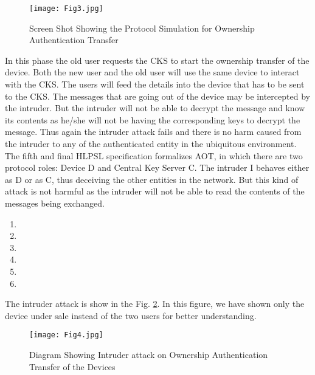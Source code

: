 \documentclass[letterpaper]{article}
\begin{document}
\begin{figure}[bpht!]
\centering
\texttt{[image: Fig3.jpg]}
\caption{Screen Shot Showing the Protocol Simulation for Ownership Authentication Transfer }
\label{fig:3}
\end{figure} 

In this phase the old user requests the CKS to start the ownership transfer of the device. Both the new user and the old user will use the same device to interact with the CKS. The users will feed the details into the device that has to be sent to the CKS. The messages that are going out of the device may be intercepted by the intruder. But the intruder will not be able to decrypt the message and know its contents as he/she will not be having the corresponding keys to decrypt the message. Thus again the intruder attack fails and there is no harm caused from the intruder to any of the authenticated entity in the ubiquitous environment. 
The fifth and final HLPSL specification formalizes AOT, in which there are two protocol roles: Device D and Central Key Server C. The intruder I behaves either as D or as C, thus deceiving the other entities in the network. But this kind of attack is not harmful as the intruder will not be able to read the contents of the messages being exchanged.
\begin{enumerate}
	\item 
	\item 
	\item 
	\item 
	\item 
	\item 
\end{enumerate}
The intruder attack is show in the Fig. \ref{fig:4}. In this figure, we have shown only the device under sale instead of the two users for better understanding. 
\begin{figure}[bpht!]
\centering
\texttt{[image: Fig4.jpg]}
\caption{Diagram Showing Intruder attack on Ownership Authentication Transfer of the Devices}
\label{fig:4}
\end{figure}
\end{document}
